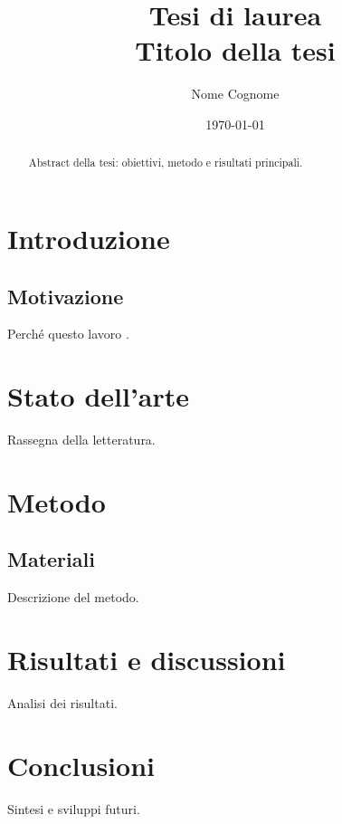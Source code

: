 \documentclass[12pt,a4paper]{report}
\title{Tesi di laurea\\Titolo della tesi}
\author{Nome Cognome}
\date{\today}
\begin{document}
\maketitle

\begin{abstract}
\onehalfspacing
Abstract della tesi: obiettivi, metodo e risultati principali.
\end{abstract}

\tableofcontents

\chapter{Introduzione}
\section{Motivazione}
Perch\'e questo lavoro \cite{knuth1986}.

\chapter{Stato dell'arte}
Rassegna della letteratura.

\chapter{Metodo}
\section{Materiali}
Descrizione del metodo.

\chapter{Risultati e discussioni}
Analisi dei risultati.

\chapter{Conclusioni}
Sintesi e sviluppi futuri.



\end{document}
